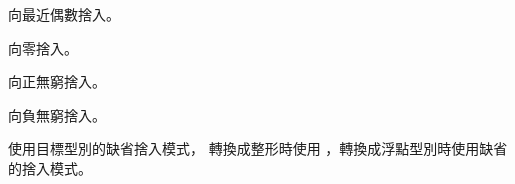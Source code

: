\startCLOD[修飾符][捨入模式描述]

{向最近偶數捨入。}

{向零捨入。}

{向正無窮捨入。}

{向負無窮捨入。}

{使用目標型別的缺省捨入模式，
轉換成整形時使用 ，轉換成浮點型別時使用缺省的捨入模式。}

\stopCLOD

